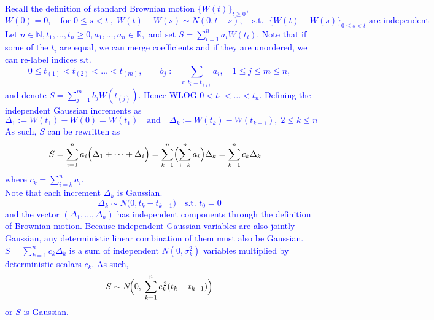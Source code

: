 \documentclass{article}
\begin{document}
\textcolor{blue}{
Recall the definition of standard Brownian motion $\{W(t)\}_{t\ge0}$,
$$
W(0)=0,\quad
\text{for }0\le s<t\;,\;W(t)-W(s)\sim N(0,t-s),\quad \text{s.t. }\;
\{W(t)-W(s)\}_{0\le s<t}\text{ are independent}
$$
Let
$
n\in\mathbb N,
t_1,\dots,t_n\ge0,
a_1,\dots,a_n\in\mathbb R,
$  
and set  
$
S=\sum_{i=1}^{n}a_iW(t_i).
$  
Note that if some of the $t_i$ are equal, we can merge coefficients and if they are unordered,
we can re-label indices s.t.
$$
0\le t_{(1)}<t_{(2)}<\dots<t_{(m)},\qquad
b_j:=\sum_{i:\,t_i=t_{(j)}}a_i,\quad 1\le j\le m\le n,
$$
and denote $S=\sum_{j=1}^{m}b_jW(t_{(j)})$.  
Hence WLOG $0<t_1<\dots<t_n$.
Defining the independent Gaussian increments as
$$
\Delta_1:=W(t_1)-W(0)=W(t_1)\quad \text{and} \quad
\Delta_k:=W(t_k)-W(t_{k-1}),\;2\le k\le n
$$
As such, $S$ can be rewritten as
$$
\begin{aligned}
S
&=\sum_{i=1}^{n}a_i\Bigl(\Delta_1+\cdots+\Delta_i\Bigr)
 =\sum_{k=1}^{n}\Bigl(\sum_{i=k}^{n}a_i\Bigr)\Delta_k
 =\sum_{k=1}^{n}c_k\Delta_k
\end{aligned}
$$
where $c_k=\sum_{i=k}^{n}a_i$. \\
Note that each increment $\Delta_k$ is Gaussian.
$$
\Delta_k\sim N\bigl(0,t_k-t_{k-1}\bigr)\quad\text{s.t. }t_0=0
$$
and the vector $(\Delta_1,\dots,\Delta_n)$ has independent components through the definition of Brownian motion.  
Because independent Gaussian variables are also jointly Gaussian, any deterministic linear combination of them must also be Gaussian.
$
S=\sum_{k=1}^{n}c_k\Delta_k
$
is a sum of independent $N(0,\sigma_k^2)$ variables multiplied by deterministic scalars $c_k$. As such,
$$
S\sim N\!\Bigl(0,\;\sum_{k=1}^{n}c_k^{\,2}(t_k-t_{k-1})\Bigr)
$$
or $S$ is Gaussian.
}
\end{document}
